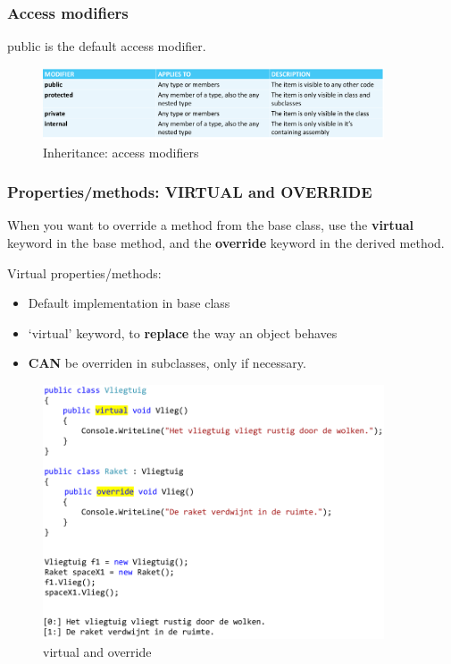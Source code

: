 \documentclass{article}
\newcommand{\bold}[1]{\textbf{#1}}
\begin{document}
\subsubsection{Access modifiers}

public is the default access modifier.

\begin{figure}[H]
    \centering
    \includegraphics[width=0.9\textwidth]{inheritance-access-modifiers.png}
    \caption{Inheritance: access modifiers}
\end{figure}

\subsubsection{Properties/methods: VIRTUAL and OVERRIDE}

When you want to override a method from the base class, 
use the \bold{virtual} keyword in the base method,
and the \bold{override} keyword in the derived method.

Virtual properties/methods:
\begin{itemize}
    \item Default implementation in base class
    \item `virtual' keyword, to \bold{replace} the way an object behaves
    \item \bold{CAN} be overriden in subclasses, only if necessary.
\end{itemize}

\begin{figure}[H]
    \centering
    \includegraphics[width=0.9\textwidth]{inheritance-override.png}
    \caption{virtual and override}
\end{figure}
\end{document}
